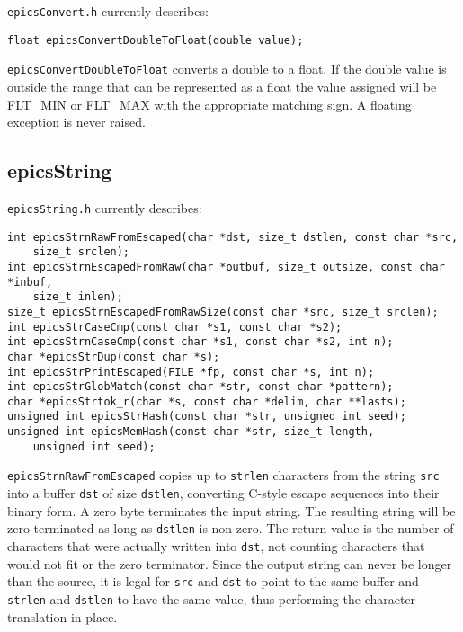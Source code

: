 \verb|epicsConvert.h| currently describes:

\begin{verbatim}
float epicsConvertDoubleToFloat(double value);
\end{verbatim}

\verb|epicsConvertDoubleToFloat| converts a double to a float.
If the double value is outside the range that can be represented as a float the value assigned will be FLT\_MIN or FLT\_MAX with the appropriate matching sign.
A floating exception is never raised.

\subsection{epicsString}

\verb|epicsString.h| currently describes:

\begin{verbatim}
int epicsStrnRawFromEscaped(char *dst, size_t dstlen, const char *src,
    size_t srclen);
int epicsStrnEscapedFromRaw(char *outbuf, size_t outsize, const char *inbuf,
    size_t inlen);
size_t epicsStrnEscapedFromRawSize(const char *src, size_t srclen);
int epicsStrCaseCmp(const char *s1, const char *s2);
int epicsStrnCaseCmp(const char *s1, const char *s2, int n);
char *epicsStrDup(const char *s);
int epicsStrPrintEscaped(FILE *fp, const char *s, int n);
int epicsStrGlobMatch(const char *str, const char *pattern);
char *epicsStrtok_r(char *s, const char *delim, char **lasts);
unsigned int epicsStrHash(const char *str, unsigned int seed);
unsigned int epicsMemHash(const char *str, size_t length,
    unsigned int seed);
\end{verbatim}


\verb|epicsStrnRawFromEscaped| copies up to \verb|strlen| characters from the string \verb|src| into a buffer \verb|dst| of size \verb|dstlen|, converting C-style escape sequences into their binary form.
A zero byte terminates the input string.
The resulting string will be zero-terminated as long as \verb|dstlen| is non-zero.
The return value is the number of characters that were actually written into \verb|dst|, not counting characters that would not fit or the zero terminator.
Since the output string can never be longer than the source, it is legal for \verb|src| and \verb|dst| to point to the same buffer and \verb|strlen| and \verb|dstlen| to have the same value, thus performing the character translation in-place.


